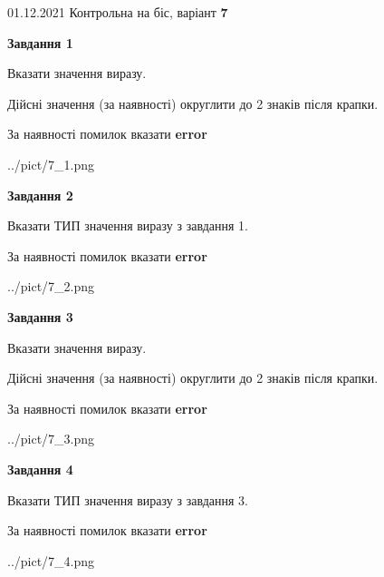 \documentclass[11pt, ukrainian]{article}
\begin{document}
{01.12.2021 Контрольна на біс, варіант  \No \textbf { 7 }\par}
{
\begin {large}
{\begin {center}\textbf{Завдання 1}\end {center}}\par
Вказати значення виразу. \par
Дійсні значення (за наявності) округлити до 2 знаків після крапки. \par
За наявності помилок вказати \textbf{error}

\begin{center}
	{../pict/7_1.png}
\end{center}
\newpage

{\begin {center}\textbf{Завдання 2}\end {center}}\par
Вказати ТИП значення виразу з завдання 1. \par
За наявності помилок вказати \textbf{error}

\begin{center}
	{../pict/7_2.png}
\end{center}
\newpage

{\begin {center}\textbf{Завдання 3}\end {center}}\par
Вказати значення виразу. \par
Дійсні значення (за наявності) округлити до 2 знаків після крапки. \par
За наявності помилок вказати \textbf{error}

\begin{center}
	{../pict/7_3.png}
\end{center}
\newpage

{\begin {center}\textbf{Завдання 4}\end {center}}\par
Вказати ТИП значення виразу з завдання 3. \par
За наявності помилок вказати \textbf{error}

\begin{center}
	{../pict/7_4.png}
\end{center}
\newpage


\end{large}}
\end{document}
